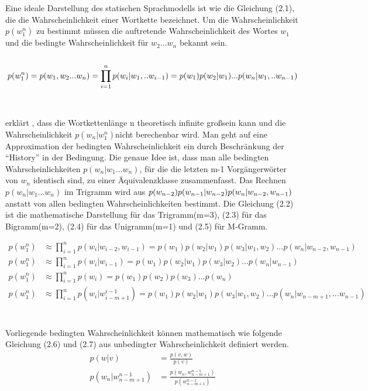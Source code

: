 Eine ideale Darstellung des statischen Sprachmodells ist wie die Gleichung (2.1), die die Wahrscheinlichkeit einer Wortkette bezeichnet. Um die Wahrscheinlichkeit $p(w_{1}^n)$ zu bestimmt m\"ussen die auftretende Wahrscheinlichkeit des Wortes $w_{1}$ und die bedingte Wahrscheinlichkeit f\"ur $w_{2}...w_{n}$ bekannt sein.
\\
\\
\begin{equation}
p(w_{1}^n) = p(w_{1},w_{2}...w_{n}) = \prod_{i=1}^n p(w_{i}|w_{1},..w_{i-1}) \\
= p(w_{1})p(w_{2}|w_{1})...p(w_{n}|w_{1},..w_{n-1})
\end{equation}
\\
\\
\cite{book_speech} erkl\"art , dass die Wortkettenl\"ange n theoretisch infinite gro\ss sein kann und die Wahrscheinlichkeit $p(w_{n}|w_{1}^n)$nicht berechenbar wird. Man geht auf eine Approximation der bedingten Wahrscheinlichkeit ein durch Beschr\"ankung der "`History"' in der Bedingung. Die genaue Idee ist, dass man alle bedingten Wahrscheinlichkeiten $p(w_{n}|w_{1}...w_{n})$, f\"ur die die letzten m-1 Vorg\"angerw\"orter von $w_{n}$ identisch sind, zu einer \"Aquivalenzklasse zusammenfasst. Das Rechnen $p(w_{n}|w_{1}...w_{n})$ im Trigramm wird aus $p(w_{n-2})p(w_{n-1}|w_{n-2})p(w_{n}|\\w_{n-2},w_{n-1})$ anstatt von allen bedingten Wahrscheinlichkeiten bestimmt. 
Die Gleichung (2.2) ist die mathematische Darstellung f\"ur das Trigramm(m=3), (2.3) f\"ur das Bigramm(m=2), (2.4) f\"ur das Unigramm(m=1) und (2.5) f\"ur M-Gramm.

\begin{align}
p(w_{1}^n) & \approx \prod_{i=1}^n p(w_{i}|w_{i-2},w_{i-1})=p(w_{1})p(w_{2}|w_{1})p(w_{3}|w_{1},w_{2})...p(w_{n}|w_{n-2},w_{n-1}) \\
p(w_{1}^n) & \approx \prod_{i=1}^n p(w_{i}|w_{i-1})=p(w_{1})p(w_{2}|w_{1})p(w_{3}|w_{2})...p(w_{n}|w_{n-1}) \\
p(w_{1}^n) & \approx \prod_{i=1}^n p(w_{i})=p(w_{1})p(w_{2})p(w_{3})...p(w_{n})\\
p(w_{1}^n) & \approx \prod_{i=1}^n p(w_{i}|w_{i-m+1}^{i-1})=p(w_{1})p(w_{2}|w_{1})p(w_{3}|w_{1},w_{2})...p(w_{n}|w_{n-m+1},...w_{n-1})
\end{align}
\\
\\
Vorliegende bedingten Wahrscheinlichkeit k\"onnen mathematisch wie folgende Gleichung (2.6) und (2.7)  aus unbedingter Wahrscheinlichkeit definiert werden.
\begin{align}
p(w|v) &=\frac{p(v,w)}{p(v)} \\
p(w_{n}|w_{n-m+1}^{n-1}) &=\frac{p(w_{n},w_{n-m+1}^{n-1} )}{p(w_{n-m+1}^{n-1})} 
\end{align}

